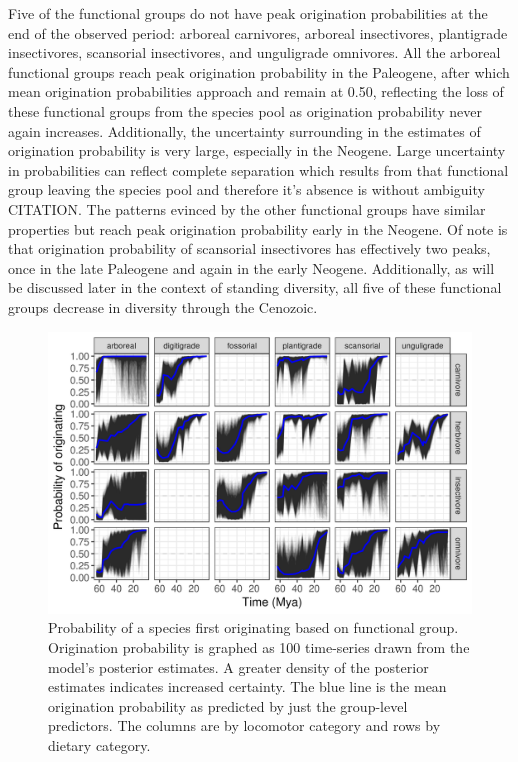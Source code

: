 \documentclass[12pt,letterpaper]{article}
\begin{document}
Five of the functional groups do not have peak origination probabilities at the end of the observed period: arboreal carnivores, arboreal insectivores, plantigrade insectivores, scansorial insectivores, and unguligrade omnivores. All the arboreal functional groups reach peak origination probability in the Paleogene, after which mean origination probabilities approach and remain at 0.50, reflecting the loss of these functional groups from the species pool as origination probability never again increases. Additionally, the uncertainty surrounding in the estimates of origination probability is very large, especially in the Neogene. Large uncertainty in probabilities can reflect complete separation which results from that functional group leaving the species pool and therefore it's absence is without ambiguity CITATION. The patterns evinced by the other functional groups have similar properties but reach peak origination probability early in the Neogene. Of note is that origination probability of scansorial insectivores has effectively two peaks, once in the late Paleogene and again in the early Neogene. Additionally, as will be discussed later in the context of standing diversity, all five of these functional groups decrease in diversity through the Cenozoic. 
\begin{figure}[ht]
  \centering
  \includegraphics[width=\textwidth,height=0.4\textheight,keepaspectratio=true]{figure/ecotype_origin_bd}
  \caption{Probability of a species first originating based on functional group. Origination probability is graphed as 100 time-series drawn from the model's posterior estimates. A greater density of the posterior estimates indicates increased certainty. The blue line is the mean origination probability as predicted by just the group-level predictors. The columns are by locomotor category and rows by dietary category.}
  \label{fig:eco_origin}
\end{figure}
\end{document}
